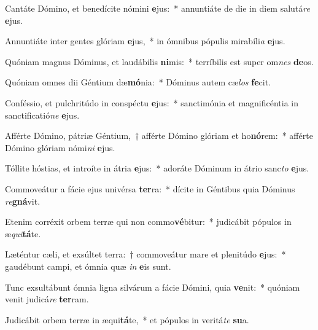 \item Cantáte Dómino, et benedícite nómini \textbf{e}jus:~* annuntiáte de die in diem salutá\textit{re} \textbf{e}jus.
\item Annuntiáte inter gentes glóriam \textbf{e}jus,~* in ómnibus pópulis mirabíli\textit{a} \textbf{e}jus.
\item Quóniam magnus Dóminus, et laudábilis \textbf{ni}mis:~* terríbilis est super om\textit{nes} \textbf{de}os.
\item Quóniam omnes dii Géntium dæ\textbf{mó}nia:~* Dóminus autem cæ\textit{los} \textbf{fe}cit.
\item Conféssio, et pulchritúdo in conspéctu \textbf{e}jus:~* sanctimónia et magnificéntia in sanctificatió\textit{ne} \textbf{e}jus.
\item Afférte Dómino, pátriæ Géntium,~† afférte Dómino glóriam et ho\textbf{nó}rem:~* afférte Dómino glóriam nómi\textit{ni} \textbf{e}jus.
\item Tóllite hóstias, et introíte in átria \textbf{e}jus:~* adoráte Dóminum in átrio sanc\textit{to} \textbf{e}jus.
\item Commoveátur a fácie ejus univérsa \textbf{ter}ra:~* dícite in Géntibus quia Dóminus \textit{re}\textbf{gná}vit.
\item Etenim corréxit orbem terræ qui non commo\textbf{vé}bitur:~* judicábit pópulos in æ\textit{qui}\textbf{tá}te.
\item Læténtur cæli, et exsúltet terra:~† commoveátur mare et plenitúdo \textbf{e}jus:~* gaudébunt campi, et ómnia quæ \textit{in} \textbf{e}is sunt.
\item Tunc exsultábunt ómnia ligna silvárum a fácie Dómini, quia \textbf{ve}nit:~* quóniam venit judicá\textit{re} \textbf{ter}ram.
\item Judicábit orbem terræ in æqui\textbf{tá}te,~* et pópulos in veritá\textit{te} \textbf{su}a.
